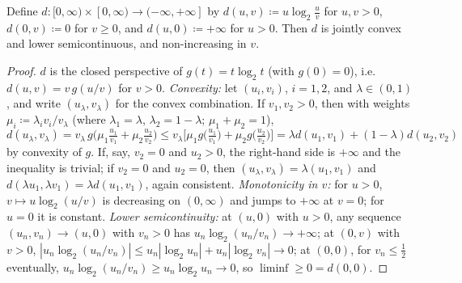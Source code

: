 
\begin{lemma}\label{lem:kernel}
Define $d:[0,\infty)\times[0,\infty)\to(-\infty,+\infty]$ by
$d(u,v)\coloneqq u\log_2\frac uv$ for $u,v>0$, $d(0,v)\coloneqq0$ for
$v\ge0$, and $d(u,0)\coloneqq+\infty$ for $u>0$. Then $d$ is jointly
convex and lower semicontinuous, and non-increasing in $v$.
\end{lemma}

\begin{proof}
$d$ is the closed perspective of $g(t)=t\log_2t$ (with $g(0)=0$), i.e.\
$d(u,v)=v\,g(u/v)$ for $v>0$. \emph{Convexity:} let
$(u_i,v_i)$, $i=1,2$, and $\lambda\in(0,1)$, and write
$(u_{\lambda},v_{\lambda})$ for the convex combination. If
$v_1,v_2>0$, then with weights
$\mu_i\coloneqq\lambda_iv_i/v_{\lambda}$ (where
$\lambda_1=\lambda$, $\lambda_2=1-\lambda$; $\mu_1+\mu_2=1$),
\begin{equation*}
  d(u_{\lambda},v_{\lambda})
  =v_{\lambda}\,g\!\Big(\mu_1\tfrac{u_1}{v_1}+\mu_2\tfrac{u_2}{v_2}\Big)
  \le v_{\lambda}\Big[\mu_1g\big(\tfrac{u_1}{v_1}\big)
  +\mu_2g\big(\tfrac{u_2}{v_2}\big)\Big]
  =\lambda d(u_1,v_1)+(1-\lambda)d(u_2,v_2)
\end{equation*}
by convexity of $g$. If, say, $v_2=0$ and $u_2>0$, the right-hand side is
$+\infty$ and the inequality is trivial; if $v_2=0$ and $u_2=0$, then
$(u_{\lambda},v_{\lambda})=\lambda(u_1,v_1)$ and
$d(\lambda u_1,\lambda v_1)=\lambda d(u_1,v_1)$, again consistent.
\emph{Monotonicity in $v$:} for $u>0$, $v\mapsto u\log_2(u/v)$ is
decreasing on $(0,\infty)$ and jumps to $+\infty$ at $v=0$; for $u=0$ it is
constant. \emph{Lower semicontinuity:} at $(u,0)$ with $u>0$, any sequence
$(u_n,v_n)\to(u,0)$ with $v_n>0$ has
$u_n\log_2(u_n/v_n)\to+\infty$; at $(0,v)$ with $v>0$,
$|u_n\log_2(u_n/v_n)|\le u_n|\log_2u_n|+u_n|\log_2v_n|\to0$; at $(0,0)$,
for $v_n\le\frac12$ eventually,
$u_n\log_2(u_n/v_n)\ge u_n\log_2u_n\to0$, so
$\liminf\ge0=d(0,0)$.
\end{proof}
